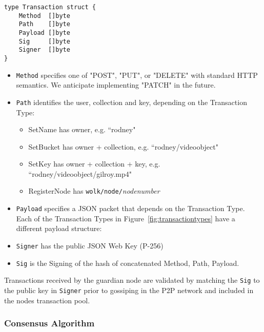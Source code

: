 \documentclass[journal]{IEEEtran}
\newcommand{\tx}[1]{\textsf{#1}}
\begin{document}
\begin{footnotesize}
\begin{verbatim}
type Transaction struct {
    Method  []byte
    Path    []byte
    Payload []byte
    Sig     []byte
    Signer  []byte
}
\end{verbatim}
\end{footnotesize}

\begin{itemize}
    \item {\tt Method} specifies one of "POST", "PUT", or "DELETE" with standard HTTP semantics.  We anticipate implementing "PATCH" in the future.
    \item {\tt Path} identifies the user, collection and key, depending on the Transaction Type:
    \begin{itemize}
        \item \tx{SetName} has owner, e.g. ``rodney"
        \item \tx{SetBucket} has owner + collection, e.g. ``rodney/videoobject"
        \item \tx{SetKey} has owner + collection + key, e.g. ``rodney/videoobject/gilroy.mp4"
        \item \tx{RegisterNode} has {\tt wolk/node/}{\em nodenumber}
    \end{itemize}
    \item {\tt Payload} specifies a JSON packet that depends on the Transaction Type.  Each of the Transaction Types in Figure~\ref{fig:transactiontypes} have a different payload structure:
    \item {\tt Signer} has the public JSON Web Key (P-256)
    \item {\tt Sig} is the Signing of the hash of concatenated Method, Path, Payload.
\end{itemize}

Transactions received by the guardian node are validated by matching the {\tt Sig} to the public key in {\tt Signer} prior to gossiping in the P2P network and included in the nodes transaction pool.



\subsubsection{Consensus Algorithm}
\end{document}

